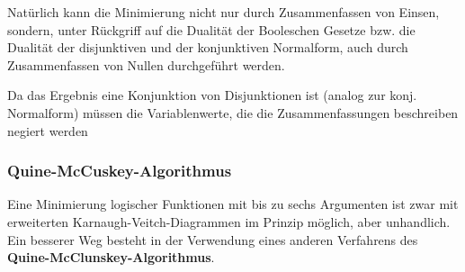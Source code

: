 \documentclass[12pt]{report}
\begin{document}
\begin{infobox}
  Natürlich kann die Minimierung nicht nur durch Zusammenfassen von Einsen, sondern, 
  unter Rückgriff auf die Dualität der Booleschen Gesetze bzw. 
  die Dualität der disjunktiven und der konjunktiven Normalform, 
  auch durch Zusammenfassen von Nullen durchgeführt werden.
  
  Da das Ergebnis eine Konjunktion von Disjunktionen ist (analog zur konj. Normalform) 
  müssen die Variablenwerte, 
  die die Zusammenfassungen beschreiben negiert werden
\end{infobox}
\subsubsection{Quine-McCuskey-Algorithmus}
Eine Minimierung logischer Funktionen mit bis zu sechs Argumenten ist zwar mit erweiterten 
Karnaugh-Veitch-Diagrammen im Prinzip möglich, aber unhandlich. Ein besserer Weg besteht 
in der Verwendung eines anderen Verfahrens des \textbf{Quine-McClunskey-Algorithmus}.
\end{document}
